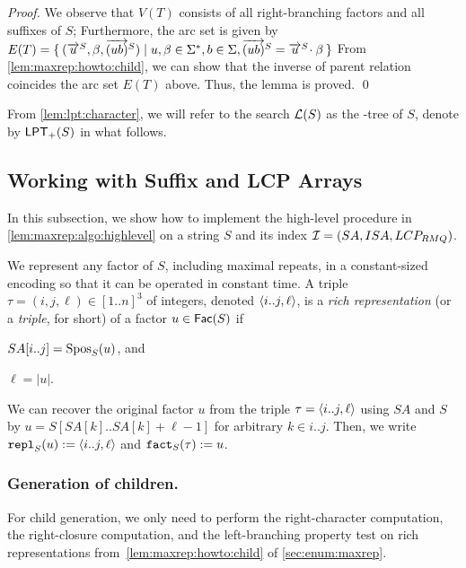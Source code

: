 \begin{proof}
  We observe that $V(T)$ consists of all right-branching factors and all suffixes of $S$; Furthermore, the arc set is given by $E(T) = \{\kern0.2em (\overrightarrow{u}^{S}, \beta, \overrightarrow{(ub)}^{S}) \mid u, \beta \in \Sigma^*, b \in \Sigma, \overrightarrow{(ub)}^{S} = \overrightarrow{u}^{S}\!\cdot \beta \kern0.2em\}$
From \cref{lem:maxrep:howto:child}, we can show that the inverse of parent relation coincides the arc set $E(T)$ above. Thus, the lemma is proved. 
\qed
\end{proof}

From \cref{lem:lpt:character}, we will refer to the search $\mathcal{L}(S)$ as the \LPTrm-tree of $S$, denote by $\mathsf{LPT}_{+}(S)$ in what follows. 


\subsection{Working with Suffix and LCP Arrays}
\label{sec:constant:size:rep}

In this subsection, we show how to implement the high-level procedure in \cref{lem:maxrep:algo:highlevel} on a string $S$ and its index $\mathcal{I} = (SA, ISA, LCP_{RMQ})$.

\label{sec:constant:size:rep}
We represent any factor of $S$, including maximal repeats, in a constant-sized encoding so that it can be operated in constant time. 
A triple $\tau = (i, j, \ell) \in [1..n]^3$ of integers, denoted $\langle i..j, \ell\rangle$, is a \textit{rich representation} (or a \textit{triple}, for short) of a factor $u \in \mathsf{Fac}{(S)}$ if
\begin{enumerate*}[(i)]
\item $SA[i..j] = \mathrm{Spos}_{S}(u)$, and 
\item $\ell = |u|$.
\end{enumerate*}
We can recover the original factor $u$ from the triple $\tau = \langle i..j, \ell\rangle$ using $SA$ and $S$ by $u = S[SA[k]..SA[k]+\ell-1]$ for arbitrary $k \in i..j$. Then, we write $\mathtt{repl}_{S}(u) := \langle i..j, \ell\rangle$ and $\mathtt{fact}_{S}(\tau) := u$. 

\subsubsection{Generation of children.}
For child generation, we only need to perform the right-character computation, the right-closure computation, and the left-branching property test on rich representations from~\cref{lem:maxrep:howto:child} of \cref{sec:enum:maxrep}.

